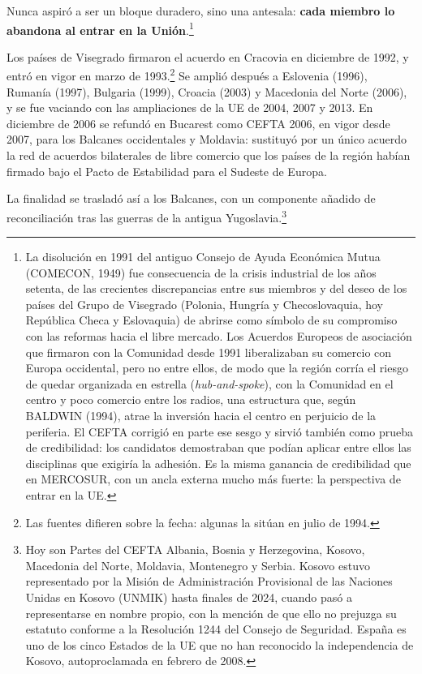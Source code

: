 \documentclass[10pt,a4paper]{article}
\begin{document}
Nunca aspiró a ser un bloque duradero, sino una antesala: \textbf{cada miembro lo abandona al entrar en la Unión}.\footnote{%
    La disolución en 1991 del antiguo Consejo de Ayuda Económica Mutua (COMECON, 1949) fue consecuencia de la crisis industrial de los años setenta, de las crecientes discrepancias entre sus miembros y del deseo de los países del Grupo de Visegrado (Polonia, Hungría y Checoslovaquia, hoy República Checa y Eslovaquia) de abrirse como símbolo de su compromiso con las reformas hacia el libre mercado. Los Acuerdos Europeos de asociación que firmaron con la Comunidad desde 1991 liberalizaban su comercio con Europa occidental, pero no entre ellos, de modo que la región corría el riesgo de quedar organizada en estrella (\textit{hub-and-spoke}), con la Comunidad en el centro y poco comercio entre los radios, una estructura que, según BALDWIN (1994), atrae la inversión hacia el centro en perjuicio de la periferia. El CEFTA corrigió en parte ese sesgo y sirvió también como prueba de credibilidad: los candidatos demostraban que podían aplicar entre ellos las disciplinas que exigiría la adhesión. Es la misma ganancia de credibilidad que en MERCOSUR, con un ancla externa mucho más fuerte: la perspectiva de entrar en la UE.
}

Los países de Visegrado firmaron el acuerdo en Cracovia en diciembre de 1992, y entró en vigor en marzo de 1993.\footnote{%
    Las fuentes difieren sobre la fecha: algunas la sitúan en julio de 1994.
} Se amplió después a Eslovenia (1996), Rumanía (1997), Bulgaria (1999), Croacia (2003) y Macedonia del Norte (2006), y se fue vaciando con las ampliaciones de la UE de 2004, 2007 y 2013. En diciembre de 2006 se refundó en Bucarest como CEFTA 2006, en vigor desde 2007, para los Balcanes occidentales y Moldavia: sustituyó por un único acuerdo la red de acuerdos bilaterales de libre comercio que los países de la región habían firmado bajo el Pacto de Estabilidad para el Sudeste de Europa. 

La finalidad se trasladó así a los Balcanes, con un componente añadido de reconciliación tras las guerras de la antigua Yugoslavia.\footnote{%
    Hoy son Partes del CEFTA Albania, Bosnia y Herzegovina, Kosovo, Macedonia del Norte, Moldavia, Montenegro y Serbia. Kosovo estuvo representado por la Misión de Administración Provisional de las Naciones Unidas en Kosovo (UNMIK) hasta finales de 2024, cuando pasó a representarse en nombre propio, con la mención de que ello no prejuzga su estatuto conforme a la Resolución 1244 del Consejo de Seguridad. España es uno de los cinco Estados de la UE que no han reconocido la independencia de Kosovo, autoproclamada en febrero de 2008.
}
\end{document}
